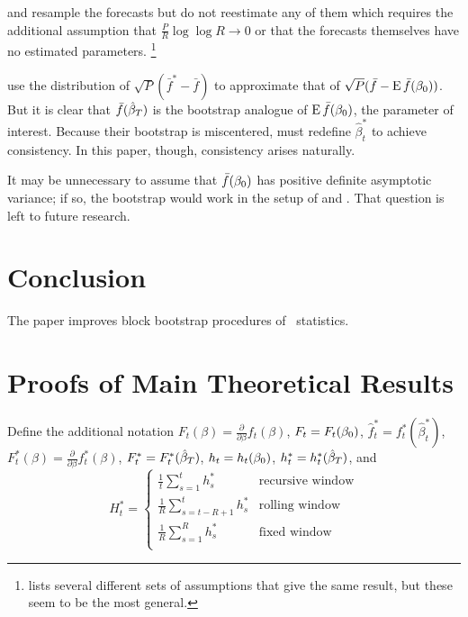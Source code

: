 \documentclass[12pt,fleqn]{article}
\begin{document}
\begin{rem}
  \citet{Whi:00} and \citet{Han:05} resample the forecasts but do not
  reestimate any of them which requires the additional assumption that
  $\tfrac{P}{R} \log \log R \to 0$ or that the forecasts themselves
  have no estimated parameters.%
\footnote{\citet{Whi:00} lists several
    different sets of assumptions that give the same result, but these
    seem to be the most general.} %
\end{rem}

\begin{rem}
  \citet{CoS:07} use the distribution of $\sqrt{P}(\bar{f}^{*} -
  \bar{f})$ to approximate that of $\sqrt{P}(\bar{f} - \E
  \bar{f}(\btrue))$.  But it is clear that $\bar{f}(\btrue[*])$
  is the bootstrap analogue of $\E \bar{f}(\btrue)$, the parameter of
  interest.  Because their bootstrap is miscentered, \citet{CoS:07}
  must redefine $\hat{\beta}_t^{*}$ to achieve consistency.  In this
  paper, though, consistency arises naturally.
\end{rem}

\begin{rem}
  It may be unnecessary to assume that $\bar{f}(\btrue)$ has positive
  definite asymptotic variance; if so, the bootstrap would work in the
  setup of \citet{ClM:05,ClM:01} and \citet{Mcc:07}.  That question is
  left to future research.
\end{rem}

\section{Conclusion}\label{sec:4}
The paper improves block bootstrap procedures of \oos\
statistics.

\appendix
\section{Proofs of Main Theoretical Results}\label{sec:B}

Define the additional notation
$F_t(\beta) = \tfrac{\partial}{\partial \beta} f_t(\beta)$,
$F_t = F_t(\btrue)$,
$\hat f_t^* = f_t^*(\hat\beta_t^*)$,
$F_t^*(\beta) = \tfrac{\partial}{\partial \beta} f_t^*(\beta)$,
$F_t^* = F_t^*(\btrue[*])$,
$h_t = h_t(\btrue)$,
$h_t^* = h_t^*(\btrue[*])$,
and
\begin{equation*}
      H_{t}^* = \begin{cases}
        \tfrac1t \sum_{s=1}^t h_{s}^* & \text{recursive window} \\
        \tfrac1R \sum_{s=t-R+1}^t h_{s}^* & \text{rolling window} \\
        \tfrac1R \sum_{s=1}^R h_{s}^* & \text{fixed window} \\
      \end{cases}
\end{equation*}
\end{document}
